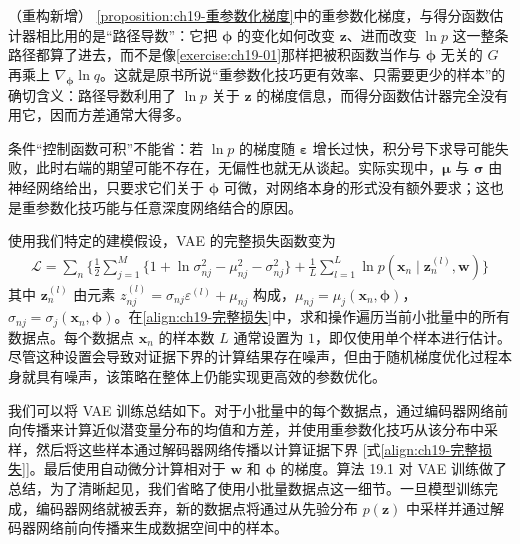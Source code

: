 \documentclass[../../main.tex]{subfiles}
\begin{document}
\begin{remark}（重构新增）
\cref{proposition:ch19-重参数化梯度}中的重参数化梯度，与得分函数估计器相比用的是“路径导数”：它把 $\bm{\phi}$ 的变化如何改变 $\bm{z}$、进而改变 $\ln p$ 这一整条路径都算了进去，而不是像\cref{exercise:ch19-01}那样把被积函数当作与 $\bm{\phi}$ 无关的 $G$ 再乘上 $\nabla_{\bm{\phi}}\ln q$。这就是原书所说“重参数化技巧更有效率、只需要更少的样本”的确切含义：路径导数利用了 $\ln p$ 关于 $\bm{z}$ 的梯度信息，而得分函数估计器完全没有用它，因而方差通常大得多。

条件“控制函数可积”不能省：若 $\ln p$ 的梯度随 $\bm{\varepsilon}$ 增长过快，积分号下求导可能失败，此时右端的期望可能不存在，无偏性也就无从谈起。实际实现中，$\bm{\mu}$ 与 $\bm{\sigma}$ 由神经网络给出，只要求它们关于 $\bm{\phi}$ 可微，对网络本身的形式没有额外要求；这也是重参数化技巧能与任意深度网络结合的原因。
\end{remark}

使用我们特定的建模假设，VAE 的完整损失函数变为
\begin{align}
\mathcal{L}=\sum_{n}\Big\{\frac{1}{2}\sum_{j=1}^{M}\big\{1+\ln\sigma_{nj}^{2}-\mu_{nj}^{2}-\sigma_{nj}^{2}\big\}+\frac{1}{L}\sum_{l=1}^{L}\ln p(\bm{x}_n\mid\bm{z}_n^{(l)},\bm{w})\Big\}
\label{align:ch19-完整损失}
\end{align}
其中 $\bm{z}_n^{(l)}$ 由元素 $z_{nj}^{(l)}=\sigma_{nj}\varepsilon^{(l)}+\mu_{nj}$ 构成，$\mu_{nj}=\mu_j(\bm{x}_n,\bm{\phi})$，$\sigma_{nj}=\sigma_j(\bm{x}_n,\bm{\phi})$。在\eqref{align:ch19-完整损失}中，求和操作遍历当前小批量中的所有数据点。每个数据点 $\bm{x}_n$ 的样本数 $L$ 通常设置为 $1$，即仅使用单个样本进行估计。尽管这种设置会导致对证据下界的计算结果存在噪声，但由于随机梯度优化过程本身就具有噪声，该策略在整体上仍能实现更高效的参数优化。

我们可以将 VAE 训练总结如下。对于小批量中的每个数据点，通过编码器网络前向传播来计算近似潜变量分布的均值和方差，并使用重参数化技巧从该分布中采样，然后将这些样本通过解码器网络传播以计算证据下界 [式\eqref{align:ch19-完整损失}]。最后使用自动微分计算相对于 $\bm{w}$ 和 $\bm{\phi}$ 的梯度。算法 19.1 对 VAE 训练做了总结，为了清晰起见，我们省略了使用小批量数据点这一细节。一旦模型训练完成，编码器网络就被丢弃，新的数据点将通过从先验分布 $p(\bm{z})$ 中采样并通过解码器网络前向传播来生成数据空间中的样本。
\end{document}

